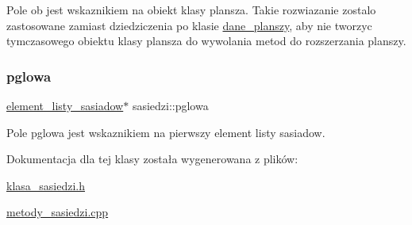Pole ob jest wskaznikiem na obiekt klasy plansza. Takie rozwiazanie zostalo zastosowane zamiast dziedziczenia po klasie \mbox{\hyperlink{classdane__planszy}{dane\+\_\+planszy}}, aby nie tworzyc tymczasowego obiektu klasy plansza do wywolania metod do rozszerzania planszy. \mbox{\label{classsasiedzi_a00fb2c23e06fb619f6db150bcd7fa23f}} 
\subsubsection{\texorpdfstring{pglowa}{pglowa}}
{\footnotesize\ttfamily \mbox{\hyperlink{classelement__listy__sasiadow}{element\+\_\+listy\+\_\+sasiadow}}$\ast$ sasiedzi\+::pglowa\hspace{0.3cm}{\ttfamily [protected]}}

Pole pglowa jest wskaznikiem na pierwszy element listy sasiadow. 

Dokumentacja dla tej klasy została wygenerowana z plików\+:\begin{DoxyCompactItemize}
\item 
\mbox{\hyperlink{klasa__sasiedzi_8h}{klasa\+\_\+sasiedzi.\+h}}\item 
\mbox{\hyperlink{metody__sasiedzi_8cpp}{metody\+\_\+sasiedzi.\+cpp}}\end{DoxyCompactItemize}
